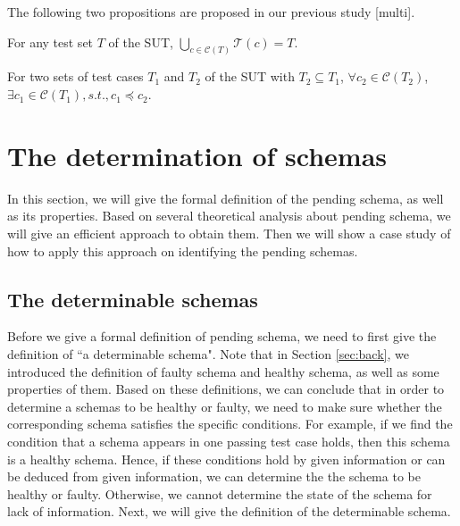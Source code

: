The following two propositions are proposed in our previous study [multi].

\begin{proposition}\label{pro:ash}
For any test set $T$ of the SUT, $\bigcup_{c \in \mathcal{C}(T)} \mathcal{T}(c) = T$.
\end{proposition}


\begin{proposition}\label{pro:ssp}
For two sets of test cases $T_{1}$ and $T_{2}$ of the SUT with $T_{2} \subseteq T_{1}$, $\forall c_{2} \in \mathcal{C}(T_{2})$, $\exists c_{1} \in \mathcal{C}(T_{1}), s.t., c_{1} \preceq c_{2}$.
\end{proposition}


\section{The determination of schemas}\label{sec:pending}
In this section, we will give the formal definition of the pending schema, as well as its properties. Based on several theoretical analysis about pending schema, we will give an efficient approach to obtain them. Then we will show a case study of  how to apply this approach on identifying the pending schemas.

\subsection{The determinable schemas}\label{sec:pending:determinable}
Before we give a formal definition of pending schema, we need to first give the definition of ``a determinable schema". Note that in Section \ref{sec:back}, we introduced the definition of faulty schema and healthy schema, as well as some properties of them. Based on these definitions, we can conclude that in order to determine a schemas to be healthy or faulty, we need to make sure whether the corresponding schema satisfies the specific conditions. For example, if we find the condition that a schema appears in one passing test case holds, then this schema is a healthy schema. Hence, if these conditions hold by given information or can be deduced from given information, we can determine the the schema to be healthy or faulty. Otherwise, we cannot determine the state of the schema for lack of information. Next, we will give the definition of the determinable schema.

